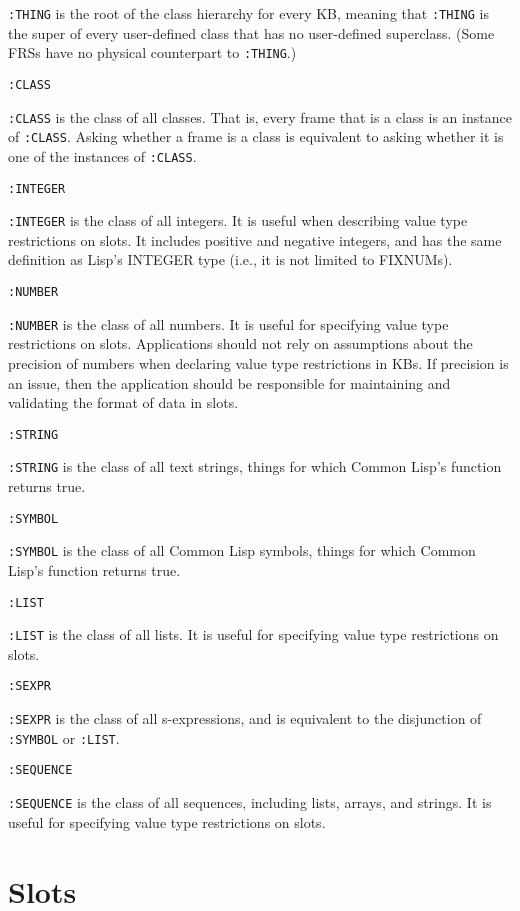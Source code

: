 {\tt :THING} is the root of the class hierarchy for every KB, meaning
that {\tt :THING} is the super of every user-defined class that has no
user-defined superclass.  (Some FRSs have no physical counterpart
to {\tt :THING}.)


{\tt :CLASS}

{\tt :CLASS} is the class of all classes.  That is, every frame that
is a class is an instance of {\tt :CLASS}.  Asking
whether a frame is a class is equivalent to asking whether it is one
of the instances of {\tt :CLASS}.

{\tt :INTEGER}

{\tt :INTEGER} is the class of all integers. It is useful when describing
value type restrictions on slots.  It includes positive and negative integers,
and has the same definition as Lisp's INTEGER type (i.e., it is not limited to
FIXNUMs).

{\tt :NUMBER}

{\tt :NUMBER} is the class of all numbers.  It is useful for
specifying value type restrictions on slots.  Applications should not
rely on assumptions about the precision of numbers when declaring
value type restrictions in KBs. If precision is an issue, then the
application should be responsible for maintaining and validating the
format of data in slots.

{\tt :STRING}

{\tt :STRING} is the class of all text strings, things for which Common Lisp's
 function returns true.

{\tt :SYMBOL}

{\tt :SYMBOL} is the class of all Common Lisp symbols, things for
which Common Lisp's
 function returns true.


{\tt :LIST}

{\tt :LIST} is the class of all lists.  It is useful for specifying
value type restrictions on slots.
 

{\tt :SEXPR}

{\tt :SEXPR} is the class of all s-expressions, and is equivalent
to the disjunction of {\tt :SYMBOL} or {\tt :LIST}.

{\tt :SEQUENCE}

{\tt :SEQUENCE} is the class of all sequences, including lists,
arrays, and strings.  It is useful for specifying value type
restrictions on slots.


\section{Slots}


